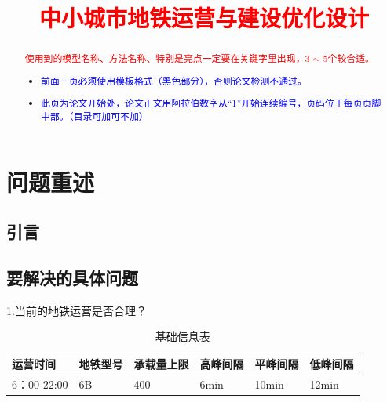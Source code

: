 \documentclass[12pt,a4paper]{mcmthesis}
\title{\textcolor{red}{中小城市地铁运营与建设优化设计}}
\date{}
\begin{document}
    \begin{abstract}
        

        \begin{keywords}
        {\song\xiaosihao
        \textcolor{red}{使用到的模型名称、方法名称、特别是亮点一定要在关键字里出现，3 $\sim$ 5个较合适。}}
        \end{keywords}

        \begin{itemize}
            \item \textcolor{blue}{前面一页必须使用模板格式（黑色部分），否则论文检测不通过。}
            \item \textcolor{blue}{此页为论文开始处，论文正文用阿拉伯数字从“1”开始连续编号，页码位于每页页脚中部。（目录可加可不加）}
        \end{itemize}

    \end{abstract}
    \maketitle
    \renewcommand{\contentsname}{\centerline{\sanhao\bfseries\HEI 目\quad 录}}
    \tableofcontents

\newpage
\setcounter{page}{1}
\section{问题重述}
\subsection{引言}


\subsection{要解决的具体问题}

   1.当前的地铁运营是否合理？

  \begin{table}
  	\centering
  	\begin{tabular}{|l|l|l|l|l|l|}
  		\hline
  		运营时间 & 地铁型号 & 承载量上限 & 高峰间隔 & 平峰间隔 & 低峰间隔 \\ \hline
  		6：00-22:00 & 6B & 400 & 6min & 10min & 12min \\ \hline
  	\end{tabular}
  	\caption{基础信息表}
  	\label{tab:基础信息表}
  \end{table}
\end{document}

